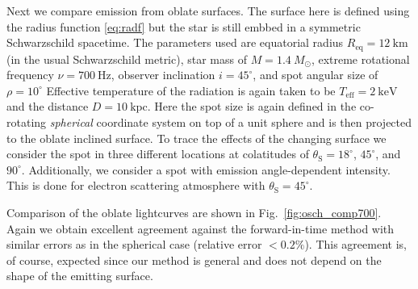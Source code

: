 \documentclass[iop, usenatbib]{emulateapj}
\newcommand{\sch}{Schwarzschild }
\newcommand{\Msun}{\ensuremath{M_{\odot}}}
\begin{document}
Next we compare emission from oblate surfaces.
The surface here is defined using the radius function \eqref{eq:radf} but the star is still embbed in a symmetric \sch spacetime.
The parameters used are equatorial radius $R_{\mathrm{eq}} = 12~\mathrm{km}$ (in the usual \sch metric), star mass of $M = 1.4~\Msun$, extreme rotational frequency $\nu = 700~\mathrm{Hz}$, observer inclination $i=45^{\circ}$, and spot angular size of $\rho = 10^{\circ}$
Effective temperature of the radiation is again taken to be $T_{\mathrm{eff}} = 2~\mathrm{keV}$ and the distance $D = 10~\mathrm{kpc}$.
Here the spot size is again defined in the co-rotating \textit{spherical} coordinate system on top of a unit sphere and is then projected to the oblate inclined surface.
To trace the effects of the changing surface we consider the spot in three different locations at colatitudes of $\theta_{\mathrm{S}} = 18^{\circ}$, $45^{\circ}$, and $90^{\circ}$.
Additionally, we consider a spot with emission angle-dependent intensity.
This is done for electron scattering atmosphere with $\theta_{\mathrm{S}} = 45^{\circ}$.

Comparison of the oblate lightcurves are shown in Fig.~\ref{fig:osch_comp700}.
Again we obtain excellent agreement against the forward-in-time method with similar errors as in the spherical case (relative error $< 0.2\%$).
This agreement is, of course, expected since our method is general and does not depend on the shape of the emitting surface.


\end{document}
